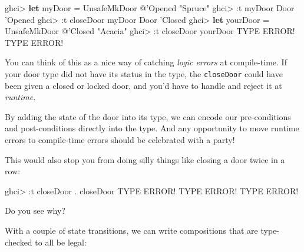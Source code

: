 \documentclass[]{article}
\newenvironment{Shaded}{}{}
\newcommand{\DataTypeTok}[1]{\textcolor[rgb]{0.56,0.13,0.00}{#1}}
\newcommand{\FunctionTok}[1]{\textcolor[rgb]{0.02,0.16,0.49}{#1}}
\newcommand{\KeywordTok}[1]{\textcolor[rgb]{0.00,0.44,0.13}{\textbf{#1}}}
\newcommand{\NormalTok}[1]{#1}
\newcommand{\StringTok}[1]{\textcolor[rgb]{0.25,0.44,0.63}{#1}}
\begin{document}
\begin{Shaded}
\begin{Highlighting}[]
\NormalTok{ghci}\FunctionTok{>} \KeywordTok{let}\NormalTok{ myDoor }\FunctionTok{=} \DataTypeTok{UnsafeMkDoor} \FunctionTok{@}\NormalTok{'}\DataTypeTok{Opened} \StringTok{"Spruce"}
\NormalTok{ghci}\FunctionTok{>} \FunctionTok{:}\NormalTok{t myDoor}
\DataTypeTok{Door}\NormalTok{ '}\DataTypeTok{Opened}
\NormalTok{ghci}\FunctionTok{>} \FunctionTok{:}\NormalTok{t closeDoor myDoor}
\DataTypeTok{Door}\NormalTok{ '}\DataTypeTok{Closed}
\NormalTok{ghci}\FunctionTok{>} \KeywordTok{let}\NormalTok{ yourDoor }\FunctionTok{=} \DataTypeTok{UnsafeMkDoor} \FunctionTok{@}\NormalTok{'}\DataTypeTok{Closed} \StringTok{"Acacia"}
\NormalTok{ghci}\FunctionTok{>} \FunctionTok{:}\NormalTok{t closeDoor yourDoor}
\DataTypeTok{TYPE} \DataTypeTok{ERROR}\FunctionTok{!}  \DataTypeTok{TYPE} \DataTypeTok{ERROR}\FunctionTok{!}
\end{Highlighting}
\end{Shaded}

You can think of this as a nice way of catching \emph{logic errors} at
compile-time. If your door type did not have its status in the type, the
\texttt{closeDoor} could have been given a closed or locked door, and you'd have
to handle and reject it at \emph{runtime}.

By adding the state of the door into its type, we can encode our pre-conditions
and post-conditions directly into the type. And any opportunity to move runtime
errors to compile-time errors should be celebrated with a party!

This would also stop you from doing silly things like closing a door twice in a
row:

\begin{Shaded}
\begin{Highlighting}[]
\NormalTok{ghci}\FunctionTok{>} \FunctionTok{:}\NormalTok{t closeDoor }\FunctionTok{.}\NormalTok{ closeDoor}
\DataTypeTok{TYPE} \DataTypeTok{ERROR}\FunctionTok{!}  \DataTypeTok{TYPE} \DataTypeTok{ERROR}\FunctionTok{!}  \DataTypeTok{TYPE} \DataTypeTok{ERROR}\FunctionTok{!}
\end{Highlighting}
\end{Shaded}

Do you see why?

With a couple of state transitions, we can write compositions that are
type-checked to all be legal:
\end{document}
